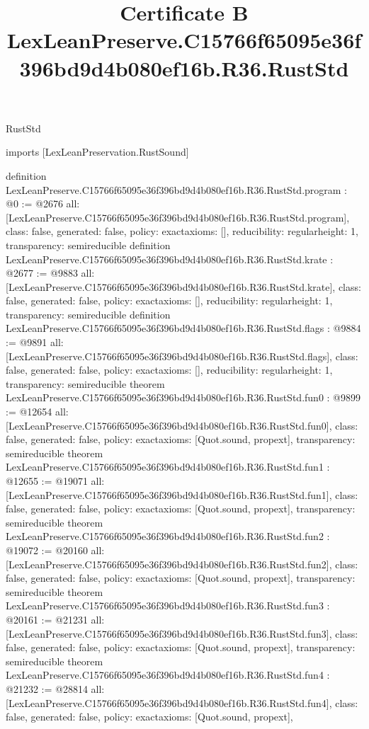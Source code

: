 \begin{lexlean}{RustStd}
\title{Certificate B LexLeanPreserve.C15766f65095e36f396bd9d4b080ef16b.R36.RustStd}
\begin{coremodule}
imports [LexLeanPreservation.RustSound]

definition LexLeanPreserve.C15766f65095e36f396bd9d4b080ef16b.R36.RustStd.program : @0 := @2676 {
  all: [LexLeanPreserve.C15766f65095e36f396bd9d4b080ef16b.R36.RustStd.program],
  class: false,
  generated: false,
  policy: exact{axioms: []},
  reducibility: regular{height: 1},
  transparency: semireducible
}
definition LexLeanPreserve.C15766f65095e36f396bd9d4b080ef16b.R36.RustStd.krate : @2677 := @9883 {
  all: [LexLeanPreserve.C15766f65095e36f396bd9d4b080ef16b.R36.RustStd.krate],
  class: false,
  generated: false,
  policy: exact{axioms: []},
  reducibility: regular{height: 1},
  transparency: semireducible
}
definition LexLeanPreserve.C15766f65095e36f396bd9d4b080ef16b.R36.RustStd.flags : @9884 := @9891 {
  all: [LexLeanPreserve.C15766f65095e36f396bd9d4b080ef16b.R36.RustStd.flags],
  class: false,
  generated: false,
  policy: exact{axioms: []},
  reducibility: regular{height: 1},
  transparency: semireducible
}
theorem LexLeanPreserve.C15766f65095e36f396bd9d4b080ef16b.R36.RustStd.fun0 : @9899 := @12654 {
  all: [LexLeanPreserve.C15766f65095e36f396bd9d4b080ef16b.R36.RustStd.fun0],
  class: false,
  generated: false,
  policy: exact{axioms: [Quot.sound, propext]},
  transparency: semireducible
}
theorem LexLeanPreserve.C15766f65095e36f396bd9d4b080ef16b.R36.RustStd.fun1 : @12655 := @19071 {
  all: [LexLeanPreserve.C15766f65095e36f396bd9d4b080ef16b.R36.RustStd.fun1],
  class: false,
  generated: false,
  policy: exact{axioms: [Quot.sound, propext]},
  transparency: semireducible
}
theorem LexLeanPreserve.C15766f65095e36f396bd9d4b080ef16b.R36.RustStd.fun2 : @19072 := @20160 {
  all: [LexLeanPreserve.C15766f65095e36f396bd9d4b080ef16b.R36.RustStd.fun2],
  class: false,
  generated: false,
  policy: exact{axioms: [Quot.sound, propext]},
  transparency: semireducible
}
theorem LexLeanPreserve.C15766f65095e36f396bd9d4b080ef16b.R36.RustStd.fun3 : @20161 := @21231 {
  all: [LexLeanPreserve.C15766f65095e36f396bd9d4b080ef16b.R36.RustStd.fun3],
  class: false,
  generated: false,
  policy: exact{axioms: [Quot.sound, propext]},
  transparency: semireducible
}
theorem LexLeanPreserve.C15766f65095e36f396bd9d4b080ef16b.R36.RustStd.fun4 : @21232 := @28814 {
  all: [LexLeanPreserve.C15766f65095e36f396bd9d4b080ef16b.R36.RustStd.fun4],
  class: false,
  generated: false,
  policy: exact{axioms: [Quot.sound, propext]},
}
\end{coremodule}
\end{lexlean}
